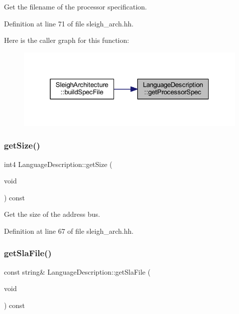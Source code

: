 Get the filename of the processor specification. 



Definition at line 71 of file sleigh\+\_\+arch.\+hh.

Here is the caller graph for this function\+:
\nopagebreak
\begin{figure}[H]
\begin{center}
\leavevmode
\includegraphics[width=319pt]{class_language_description_aef9acf96d6dda8c01984cbfc6ab4f413_icgraph}
\end{center}
\end{figure}
\mbox{\label{class_language_description_ac90031c474494dae6c1cdd8803ac265c}} 
\subsubsection{\texorpdfstring{getSize()}{getSize()}}
{\footnotesize\ttfamily int4 Language\+Description\+::get\+Size (\begin{DoxyParamCaption}\item[{void}]{ }\end{DoxyParamCaption}) const\hspace{0.3cm}{\ttfamily [inline]}}



Get the size of the address bus. 



Definition at line 67 of file sleigh\+\_\+arch.\+hh.

\mbox{\label{class_language_description_a5db9068afb97964df97afab3c10af9ad}} 
\subsubsection{\texorpdfstring{getSlaFile()}{getSlaFile()}}
{\footnotesize\ttfamily const string\& Language\+Description\+::get\+Sla\+File (\begin{DoxyParamCaption}\item[{void}]{ }\end{DoxyParamCaption}) const\hspace{0.3cm}{\ttfamily [inline]}}



